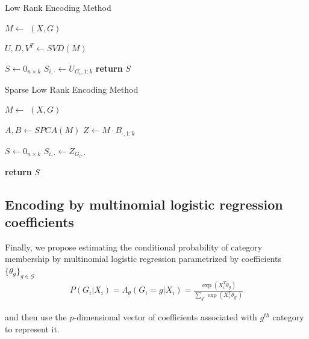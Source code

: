 \documentclass{article}
\theoremstyle{plain}
\theoremstyle{definition}
\theoremstyle{remark}
\begin{document}
\begin{algorithm}
\caption{Low Rank Encoding Method}\label{alg:lowrankmethod}
\begin{algorithmic}[1]

\State $M \gets$ $(X, G)$

\State $U,D,V^T \gets SVD(M)$

\State $S \gets 0_{n \times k}$
  \State $S_{i,\cdot} \gets U_{G_{i},1:k}$
\EndFor
\State \textbf{return} $S$
\EndProcedure
\end{algorithmic}
\end{algorithm}


\begin{algorithm}
\caption{Sparse Low Rank Encoding Method}\label{alg:sparselowrankmethod}
\begin{algorithmic}[1]
\State $M \gets$ $(X, G)$

\State $A, B \gets SPCA(M)$
\State $Z \gets M \cdot B_{\cdot,1:k}$

\State $S \gets 0_{n \times k}$
\State $S_{i,\cdot} \gets Z_{G_i,\cdot}$
\EndFor

\State \textbf{return} $S$
\EndProcedure
\end{algorithmic}
\end{algorithm}



\subsection{Encoding by multinomial logistic regression coefficients}
\label{subsec:mnl}

Finally, we propose estimating the conditional probability of category membership by multinomial logistic regression parametrized by coefficients $\{\theta_{g} \}_{g \in \mathcal{G}}$
\begin{align}
P(G_{i}|X_{i}) = \Lambda_{\theta}(G_{i}=g | X_{i}) =  \frac{\exp(X_{i}^{T} \theta_{g})}{\sum_{g'}\exp(X_{i}^{T}\theta_{g'})}
\label{eq:mnl}
\end{align}

\noindent and then use the $p$-dimensional vector of coefficients associated with $g^{th}$ category to represent it.
\end{document}
